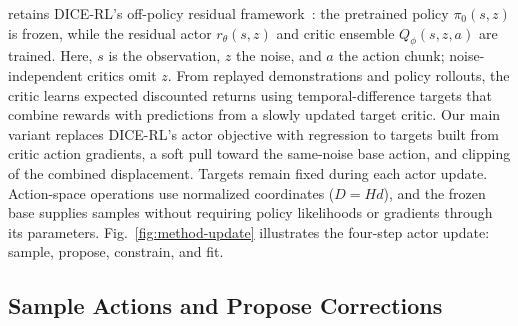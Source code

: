 

\method{} retains DICE-RL's off-policy residual framework~\cite{dicerl2026}: the pretrained policy $\pi_0(s,z)$ is frozen, while the residual actor $r_\theta(s,z)$ and critic ensemble $Q_\phi(s,z,a)$ are trained. Here, $s$ is the observation, $z$ the noise, and $a$ the action chunk; noise-independent critics omit $z$. From replayed demonstrations and policy rollouts, the critic learns expected discounted returns using temporal-difference targets that combine rewards with predictions from a slowly updated target critic. Our main variant replaces DICE-RL's actor objective with regression to targets built from critic action gradients, a soft pull toward the same-noise base action, and clipping of the combined displacement. Targets remain fixed during each actor update. Action-space operations use normalized coordinates ($D=Hd$), and the frozen base supplies samples without requiring policy likelihoods or gradients through its parameters. Fig.~\ref{fig:method-update} illustrates the four-step actor update: sample, propose, constrain, and fit.




\subsection{Sample Actions and Propose Corrections}
\label{sec:reward-field}


